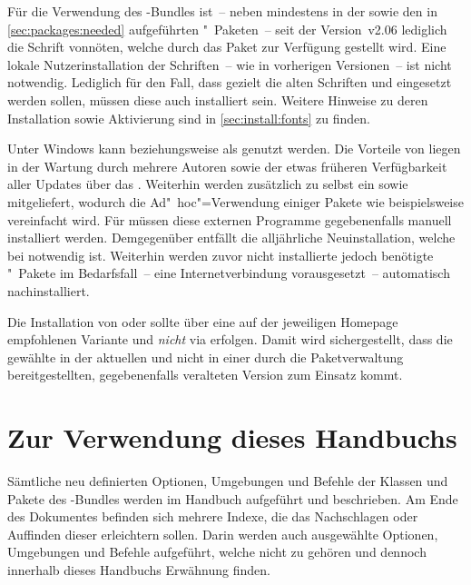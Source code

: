 Für die Verwendung des \TUDScript-Bundles ist~-- neben \KOMAScript mindestens 
in der  sowie den in \autoref{sec:packages:needed} 
aufgeführten "~Paketen~-- seit der Version~v2.06 lediglich die 
Schrift \OpenSans vonnöten, welche durch das Paket  zur 
Verfügung gestellt wird. Eine lokale Nutzerinstallation der Schriften~-- wie in 
vorherigen Versionen~-- ist nicht notwendig. Lediglich für den Fall, dass 
gezielt die alten Schriften \Univers und \DIN eingesetzt werden sollen, müssen 
diese auch installiert sein. Weitere Hinweise zu deren Installation sowie 
Aktivierung sind in \autoref{sec:install:fonts} zu finden.



Unter Windows kann \TeXLive beziehungsweise \MiKTeX als \Distro genutzt werden. 
Die Vorteile von \TeXLive liegen in der Wartung durch mehrere Autoren sowie der 
etwas früheren Verfügbarkeit aller Updates über das \CTAN. Weiterhin werden 
zusätzlich zu  selbst ein  
sowie  mitgeliefert, wodurch die Ad"~hoc"=Verwendung 
einiger Pakete wie beispielsweise  vereinfacht wird. Für 
\MiKTeX müssen diese externen Programme gegebenenfalls manuell installiert 
werden. Demgegenüber entfällt die alljährliche Neuinstallation, welche bei 
\TeXLive notwendig ist. Weiterhin werden zuvor nicht installierte jedoch 
benötigte "~Pakete im Bedarfsfall~-- eine Internetverbindung 
vorausgesetzt~-- automatisch nachinstalliert.



Die Installation von \href{https://tug.org/texlive/}{\TeXLive} oder 
\href{https://tug.org/mactex/}{\MacTeX} sollte über eine auf der jeweiligen 
Homepage empfohlenen Variante und \emph{nicht} via  
erfolgen. Damit wird sichergestellt, dass die gewählte \Distro in der aktuellen 
und nicht in einer durch die Paketverwaltung bereitgestellten, gegebenenfalls 
veralteten Version zum Einsatz kommt.



\section{Zur Verwendung dieses Handbuchs}

Sämtliche neu definierten Optionen, Umgebungen und Befehle der Klassen und 
Pakete des \TUDScript-Bundles werden im Handbuch aufgeführt und beschrieben. Am 
Ende des Dokumentes befinden sich mehrere Indexe, die das Nachschlagen oder 
Auffinden dieser erleichtern sollen. Darin werden auch ausgewählte Optionen, 
Umgebungen und Befehle aufgeführt, welche nicht zu \TUDScript gehören und 
dennoch innerhalb dieses Handbuchs Erwähnung finden.


